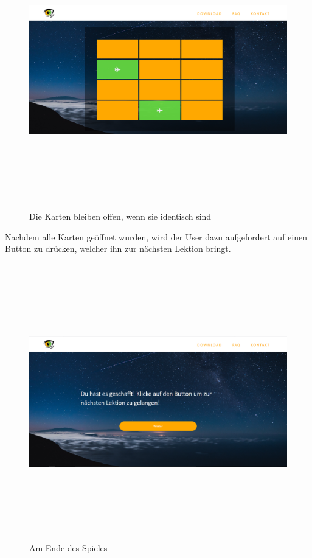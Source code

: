 \begin{figure}[h]
	\centering
\includegraphics[width=12cm,height=12cm,keepaspectratio]{webseite_memory_1} 
	\caption{Die Karten bleiben offen, wenn sie identisch sind}
\end{figure}
Nachdem alle Karten geöffnet wurden, wird der User dazu aufgefordert auf einen Button zu drücken, welcher ihn zur nächsten Lektion bringt. 
\begin{figure}[h]
	\centering
\includegraphics[width=12cm,height=12cm,keepaspectratio]{webseite_memory_2} 
	\caption{Am Ende des Spieles}
\end{figure}
